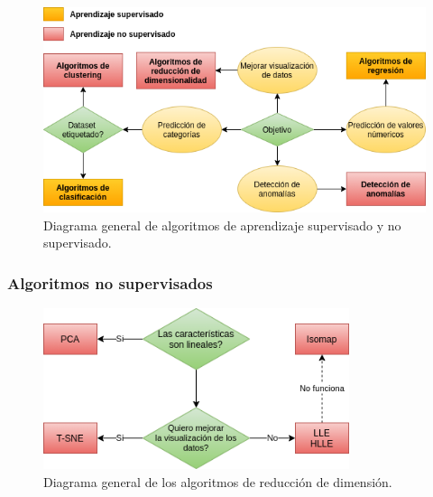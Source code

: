 \documentclass[a4paper,12pt]{article}
\begin{document}
\begin{figure}[H]
	\begin{center}				
		\includegraphics[width=1\textwidth]{maindiagram.png}
		\caption{Diagrama general de algoritmos de aprendizaje supervisado y no supervisado.}
		\label{fig:maindiagram.}
	\end{center}
\end{figure}

\subsubsection{Algoritmos no supervisados}

\begin{figure}[H]
	\begin{center}				
		\includegraphics[width=0.8\textwidth]{dimreduxdiagram.png}
		\caption{Diagrama general de los algoritmos de reducción de dimensión.}
		\label{fig:dimreduxdiagram.}
	\end{center}
\end{figure}
\end{document}
